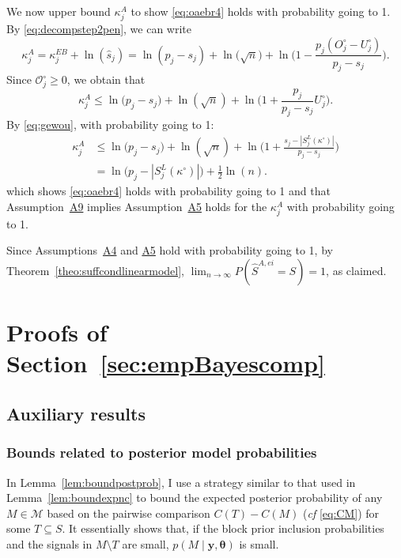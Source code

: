 \documentclass[
  12pt]{article}
\newcommand{\M}{\mathcal{M}}
\newcommand{\OO}{\mathcal{O}}
\newcommand{\by}{\mathbf{y}}
\newcommand{\btheta}{\boldsymbol{\theta}}
\begin{document}
We now upper bound $\kappa^{A}_j$ to show \eqref{eq:oaebr4} holds with probability going to 1. By \eqref{eq:decompstep2pen}, we can write
    $$\kappa_j^{A}=\kappa_j^{EB}+\ln(\widehat s_j)= \ln(p_j-s_j)+\ln\big(\sqrt{n}\big)+\ln\Big(1-\frac{p_j(O^{\circ}_j-U^{\circ}_j)}{p_j-s_j}\Big).$$
Since $\OO_j^{\circ} \geq 0$, we obtain that %
\begin{equation*}
    \kappa^{A}_j \leq \ln\big(p_j-s_j\big)+\ln(\sqrt{n})+\ln\bigg(1+\frac{p_j}{p_j-s_j}U^{\circ}_j\bigg).
\end{equation*}
By \eqref{eq:gewou}, with probability going to 1:
\begin{align}\label{eq:finalupperboundkappaj2}
    \kappa_j^A &\leq  \ln\big(p_j-s_j\big)+\ln(\sqrt{n})+\ln\bigg(1+\frac{s_j-|S^{L}_j(\kappa^{\circ})|}{p_j-s_j}\bigg)\nonumber\\
    &= \ln\big(p_j-|S^{L}_j(\kappa^{\circ})|\big)+\frac{1}{2}\ln(n).
\end{align}
which shows \eqref{eq:oaebr4} holds with probability going to 1 and that
Assumption~\hyperlink{lab:A9}{A9} implies Assumption~\hyperlink{lab:A5}{A5} holds for the $\kappa^{A}_j$ with probability going to 1. 

Since Assumptions~\hyperlink{lab:A4}{A4} and \hyperlink{lab:A5}{A5} hold with probability going to 1, by Theorem~\ref{theo:suffcondlinearmodel}, $\lim_{n\to\infty}P(\hat{S}^{A,ei}= S)= 1$, as claimed.

\section{Proofs of Section~\ref{sec:empBayescomp}}\label{suppsec:proofempBayescomp}

\subsection{Auxiliary results}
\subsubsection{Bounds related to posterior model probabilities}

In Lemma~\ref{lem:boundpostprob}, I use a strategy similar to that used in Lemma~\ref{lem:boundexpnc} to bound the expected posterior probability of any $M \in \M$ based on the pairwise comparison $C(T)-C(M)$ (\emph{cf} \eqref{eq:CM}) for some $T\subseteq S$. It essentially shows that, if the block prior inclusion probabilities and the signals in $M\setminus T$ are small, $p(M\mid \by,\btheta)$ is small.  
\end{document}

